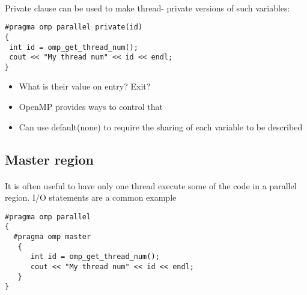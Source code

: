 \paragraph{}
Private clause can be used to make thread- private versions of such variables: 






\begin{verbatim}
#pragma omp parallel private(id)
{
 int id = omp_get_thread_num();
 cout << "My thread num" << id << endl; 
}

\end{verbatim}

\begin{itemize}
\item What is their value on entry? Exit?

\item OpenMP provides ways to control that

\item Can use default(none) to require the sharing of each variable to be described
\end{itemize}

\noindent



\subsection*{Master region}

\paragraph{}
It is often useful to have only one thread execute some of the code in a parallel region. I/O statements are a common example









\begin{verbatim}
#pragma omp parallel 
{
  #pragma omp master
   {
      int id = omp_get_thread_num();
      cout << "My thread num" << id << endl; 
   } 
}

\end{verbatim}



